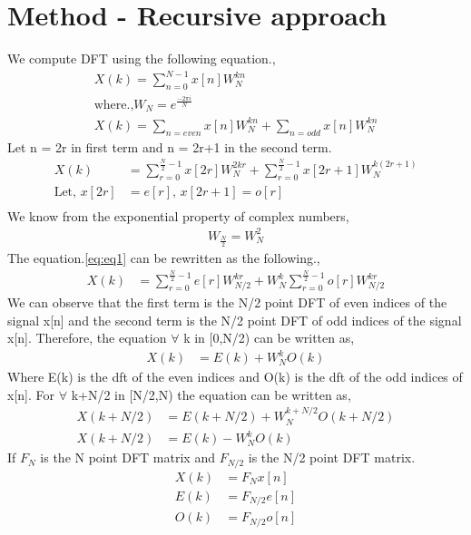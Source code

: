 \documentclass[journal,12pt,twocolumn]{IEEEtran}
\begin{document}
\section{Method - Recursive approach}
We compute DFT using the following equation.,
\begin{align}
    X(k) = \sum_{n=0}^{N-1}x[n]W_{N}^{kn} \label{eq:DFT_equation}\\
    \text{where.,} W_N = e^\frac{-2\pi i}{N}\\
    X(k) = \sum_{n=even}^{}x[n]W_{N}^{kn} + \sum_{n=odd}^{}x[n]W_{N}^{kn}
\end{align}
Let n = 2r in first term and n = 2r+1 in the second term.
\begin{align}
    X(k) &= \sum_{r=0}^{\frac{N}{2}-1}x[2r]W_{N}^{2kr} + \sum_{r=0}^{\frac{N}{2}-1}x[2r+1]W_{N}^{k(2r+1)} \label{eq:eq1}\\
\text{Let, }    x[2r]&=e[r] \text{, }x[2r+1]=o[r]\\
\end{align}
We know from the exponential property of complex numbers,
\begin{align}
    W_\frac{N}{2} = W_{N}^{2}
\end{align}
The equation.\ref{eq:eq1} can be rewritten as the following.,
\begin{align}
    X(k) &= \sum_{r=0}^{\frac{N}{2}-1}e[r]W_{N/2}^{kr} + W_{N}^k\sum_{r=0}^{\frac{N}{2}-1}o[r]W_{N/2}^{kr}
\end{align}
We can observe that the first term is the N/2 point DFT of even indices of the signal x[n] and the second term is the N/2 point DFT of odd indices of the signal x[n].
Therefore, the equation $\forall$ k in [0,N/2) can be written as, 
\begin{align}
    X(k) &= E(k) + W_{N}^k O(k)  \label{eq:eq2}
\end{align}
Where E(k) is the dft of the even indices and O(k) is the dft of the odd indices of x[n].
For $\forall$ k+N/2 in [N/2,N) the equation can be written as,
\begin{align}
    X(k+N/2) &= E(k+N/2) + W_{N}^{k+N/2} O(k+N/2)\\
    X(k+N/2) &= E(k) - W_N^k O(k) \label{eq:eq3}
\end{align}
If $F_N$ is the N point DFT matrix and $F_{N/2}$ is the N/2 point DFT matrix.
\begin{align}
    X(k) &= F_N x[n]\\
    E(k) &= F_{N/2} e[n]\\
    O(k) &= F_{N/2} o[n]
\end{align}
\end{document}
